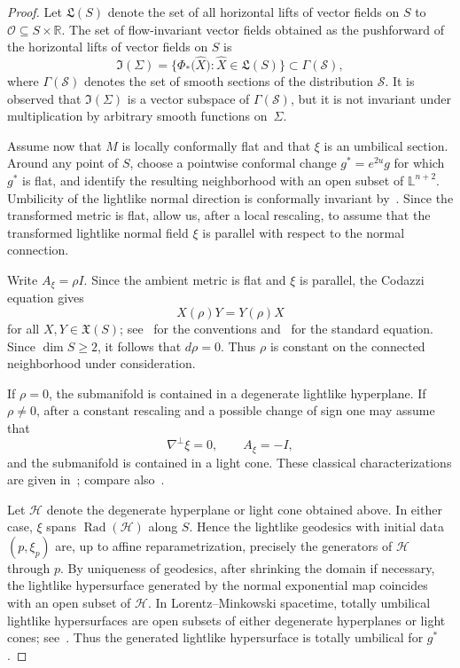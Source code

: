 \documentclass[11pt]{article}
\numberwithin{equation}{section}
\begin{document}
\begin{proof}
	Let $\mathfrak{L}(S)$ denote the set of all horizontal lifts of vector fields on $S$ to $\mathscr{O} \subseteq S \times \mathbb{R}$. 
	The set of flow-invariant vector fields obtained as the pushforward of the horizontal lifts of vector fields on $S$ is
	\[
	\mathfrak{I}(\Sigma) = \bigl\{ \Phi_*\bigl(\widehat{X}\bigr) : \widehat{X} \in \mathfrak{L}(S) \bigr\} \subset \Gamma(\mathcal{S}),
	\]
	where $\Gamma(\mathcal{S})$ denotes the set of smooth sections of the distribution $\mathcal{S}$. It is observed that $\mathfrak{I}(\Sigma)$ is a vector subspace of $\Gamma(\mathcal{S})$, but it is not invariant under multiplication by arbitrary smooth functions on~$\Sigma$.
		
	Assume now that $M$ is locally conformally flat and that $\xi$ is an umbilical section. Around any point of $S$, choose a pointwise conformal change $g^*=e^{2u}g$ for which $g^*$ is flat, and identify the resulting neighborhood with an open subset of $\mathbb L^{n+2}$. Umbilicity of the lightlike normal direction is conformally invariant by~. Since the transformed metric is flat,  allow us, after a local rescaling, to assume that the transformed lightlike normal field $\xi$ is parallel with respect to the normal connection.

	Write $A_\xi=\rho I$. Since the ambient metric is flat and $\xi$ is parallel, the Codazzi equation gives
	\[
		X(\rho)Y=Y(\rho)X
	\]
	for all $X,Y\in\mathfrak X(S)$; see~ for the conventions and~\cite{Dajczerbook} for the standard equation. Since $\dim S\ge2$, it follows that $d\rho=0$. Thus $\rho$ is constant on the connected neighborhood under consideration.

	If $\rho=0$, the submanifold is contained in a degenerate lightlike hyperplane. If $\rho\ne0$, after a constant rescaling and a possible change of sign one may assume that
	\[
		\nabla^\perp\xi=0,
		\qquad
		A_\xi=-I,
	\]
	and the submanifold is contained in a light cone. These classical characterizations are given in~\cite[Theorem~4.3]{IPR}; compare also~\cite[0.9]{Mag}.

	Let $\mathcal H$ denote the degenerate hyperplane or light cone obtained above. In either case, $\xi$ spans $\operatorname{Rad}(\mathcal H)$ along $S$. Hence the lightlike geodesics with initial data $(p,\xi_p)$ are, up to affine reparametrization, precisely the generators of $\mathcal H$ through $p$. By uniqueness of geodesics, after shrinking the domain if necessary, the lightlike hypersurface generated by the normal exponential map coincides with an open subset of $\mathcal H$. In Lorentz--Minkowski spacetime, totally umbilical lightlike hypersurfaces are open subsets of either degenerate hyperplanes or light cones; see~\cite[Corollary~8 and Theorem~13]{AkivisGoldberg}. Thus the generated lightlike hypersurface is totally umbilical for $g^*$.


\end{proof}
\end{document}

